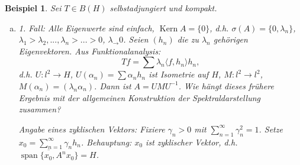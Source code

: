 \documentclass[12pt]{extreport} %
\newtheorem{Beispiel}[Satz]{Beispiel}
\DeclareMathOperator{\Kern}{Kern}
\DeclareMathOperator{\spann}{span}
\numberwithin{equation}{section}
\begin{document}
	\begin{Beispiel}
		Sei $T\in B(H)$ selbstadjungiert und kompakt.
		\begin{enumerate}[a)]
			\item 1. Fall: Alle Eigenwerte sind einfach, $\Kern A = \{0\}$, d.h. $\sigma(A) = \{0,\lambda_n \}$, $\lambda_1>\lambda_2,...,\lambda_n>...>0$, $\lambda_\rightarrow0$. Seien $(h_n)$ die zu $\lambda_n$ gehörigen Eigenvektoren. Aus Funktionalanalysis:
			$$Tf = \sum \lambda_n \langle f,h_n\rangle h_n,$$
			d.h. $U:l^2\rightarrow H$, $U(\alpha_n) = \sum \alpha_n h_n$ ist Isometrie auf $H$, $M:l^2\rightarrow l^2$, $M(\alpha_n) =(\lambda_n\alpha_n)$. Dann ist $A = UMU^{-1}$. Wie hängt dieses frühere Ergebnis mit der allgemeinen Konstruktion der Spektraldarstellung zusammen?
			
			Angabe eines zyklischen Vektors: Fixiere $\gamma_n>0$ mit $\sum_{n = 1}^{\infty}\gamma_n^2 = 1$. Setze $x_0 = \sum_{n = 1}^{\infty}\gamma_n h_n$. Behauptung: $x_0$ ist zyklischer Vektor, d.h. $\overline{\spann\{x_0, A^nx_0\}} = H$. 
			

\end{enumerate}
\end{Beispiel}
\end{document}
